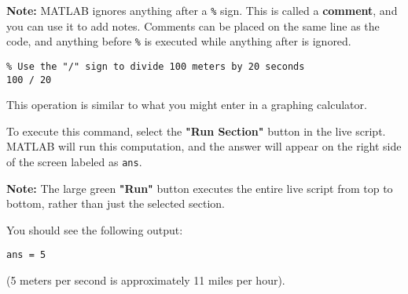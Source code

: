 \documentclass{ximera}
\begin{document}
\textbf{Note:} MATLAB ignores anything after a \texttt{\%} sign. This is called a \textbf{comment}, and you can use it to add notes. 
Comments can be placed on the same line as the code, and anything before \texttt{\%} is executed while anything after is ignored.

\begin{verbatim}
% Use the "/" sign to divide 100 meters by 20 seconds
100 / 20
\end{verbatim}

This operation is similar to what you might enter in a graphing calculator.

To execute this command, select the \textbf{"Run Section"} button in the live script. MATLAB will run this computation, 
and the answer will appear on the right side of the screen labeled as \texttt{ans}.

\textbf{Note:} The large green \textbf{"Run"} button executes the entire live script from top to bottom, rather than just the selected section.

You should see the following output:

\begin{verbatim}
ans = 5
\end{verbatim}

(5 meters per second is approximately 11 miles per hour).
\end{document}

